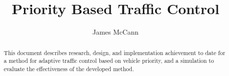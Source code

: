 \documentclass[11pt, a4paper, twoside, openright]{report}
\title{Priority Based Traffic Control}
\author{James McCann}
\date{}
\begin{document}
\frontmatter

\begin{abstract}

This document describes research, design, and implementation achievement to date for a method for adaptive traffic control based on vehicle priority, and a simulation to evaluate the effectiveness of the developed method. 
  
\end{abstract}

\maketitle



\mainmatter





\backmatter

%





\end{document}
